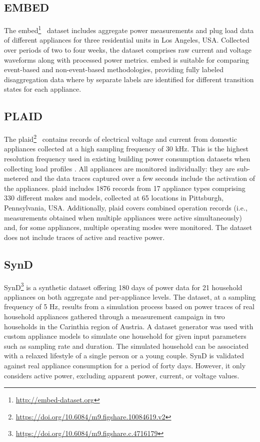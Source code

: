 \subsection{EMBED}

The \acrlong{embed}\footnote{\url{http://embed-dataset.org}}~\parencite{jazizadehEMBEDDatasetEnergy2018} dataset includes aggregate power measurements and plug load data of different appliances for three residential units in Los Angeles, USA. Collected over periods of two to four weeks, the dataset comprises raw current and voltage waveforms along with processed power metrics. \acrshort{embed} is suitable for comparing event-based and non-event-based methodologies, providing fully labeled disaggregation data where by separate labels are identified for different transition states for each appliance.

\subsection{PLAID}

The \acrlong{plaid}\footnote{\url{https://doi.org/10.6084/m9.figshare.10084619.v2}}~\parencite{medicoVoltageCurrentMeasurement2020} contains records of electrical voltage and current from domestic appliances collected at a high sampling frequency of 30 kHz. This is the highest resolution frequency used in existing building power consumption datasets when collecting load profiles \parencite{himeurBuildingPowerConsumption2020}. All appliances are monitored individually: they are sub-metered and the data traces captured over a few seconds include the activation of the appliances. \acrshort{plaid} includes 1876 records from 17 appliance types comprising 330 different makes and models, collected at 65 locations in Pittsburgh, Pennsylvania, USA. Additionally, \acrshort{plaid} covers combined operation records (i.e., measurements obtained when multiple appliances were active simultaneously) and, for some appliances, multiple operating modes were monitored. The dataset does not include traces of active and reactive power.

\subsection{SynD}

SynD\footnote{\url{https://doi.org/10.6084/m9.figshare.c.4716179}} \parencite{klemenjakSyntheticEnergyDataset2020} is a synthetic dataset offering 180 days of  power data for 21 household appliances on both aggregate and per-appliance levels. The dataset, at a sampling frequency of 5 Hz, results from a simulation process based on power traces of real household appliances gathered through a measurement campaign in two households in the Carinthia region of Austria. A dataset generator was used with custom appliance models to simulate one household for given input parameters such as sampling rate and duration. The simulated household can be associated with a relaxed lifestyle of a single person or a young couple. SynD is validated against real appliance consumption for a period of forty days. However, it only considers active power, excluding apparent power, current, or voltage values.

